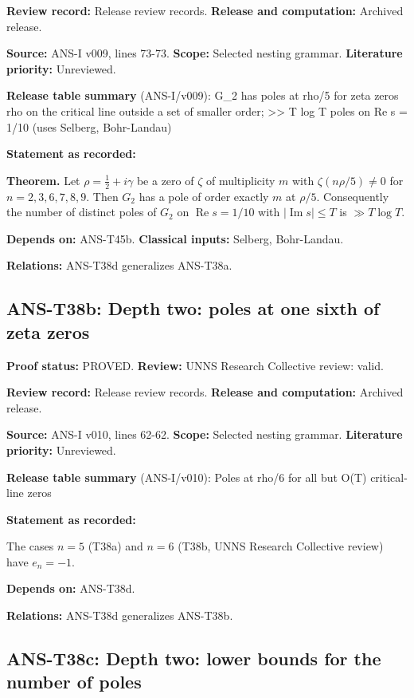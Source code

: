 \documentclass[
  11pt,
]{article}
\begin{document}
\textbf{Review record:} Release review records. \textbf{Release and
computation:} Archived release.

\textbf{Source:} ANS-I v009, lines 73-73. \textbf{Scope:} Selected
nesting grammar. \textbf{Literature priority:} Unreviewed.

\textbf{Release table summary} (ANS-I/v009): G\_2 has poles at rho/5 for
zeta zeros rho on the critical line outside a set of smaller order;
\textgreater\textgreater{} T log T poles on Re s = 1/10 (uses Selberg,
Bohr-Landau)

\textbf{Statement as recorded:}

\textbf{Theorem.} Let \(\rho=\tfrac12+i\gamma\) be a zero of \(\zeta\)
of multiplicity \(m\) with \(\zeta(n\rho/5)\ne0\) for \(n=2,3,6,7,8,9\).
Then \(G_2\) has a pole of order exactly \(m\) at \(\rho/5\).
Consequently the number of distinct poles of \(G_2\) on
\(\operatorname{Re}s=1/10\) with \(|\operatorname{Im}s|\le T\) is
\(\gg T\log T\).

\textbf{Depends on:} ANS-T45b. \textbf{Classical inputs:} Selberg,
Bohr-Landau.

\textbf{Relations:} ANS-T38d generalizes ANS-T38a.

\hypertarget{ans-t38b-depth-two-poles-at-one-sixth-of-zeta-zeros}{%
\subsection{ANS-T38b: Depth two: poles at one sixth of zeta
zeros}\label{ans-t38b-depth-two-poles-at-one-sixth-of-zeta-zeros}}

\textbf{Proof status:} PROVED. \textbf{Review:} UNNS Research Collective
review: valid.

\textbf{Review record:} Release review records. \textbf{Release and
computation:} Archived release.

\textbf{Source:} ANS-I v010, lines 62-62. \textbf{Scope:} Selected
nesting grammar. \textbf{Literature priority:} Unreviewed.

\textbf{Release table summary} (ANS-I/v010): Poles at rho/6 for all but
O(T) critical-line zeros

\textbf{Statement as recorded:}

The cases \(n=5\) (T38a) and \(n=6\) (T38b, UNNS Research Collective
review) have \(e_n=-1\).

\textbf{Depends on:} ANS-T38d.

\textbf{Relations:} ANS-T38d generalizes ANS-T38b.

\hypertarget{ans-t38c-depth-two-lower-bounds-for-the-number-of-poles}{%
\subsection{ANS-T38c: Depth two: lower bounds for the number of
poles}\label{ans-t38c-depth-two-lower-bounds-for-the-number-of-poles}}
\end{document}
